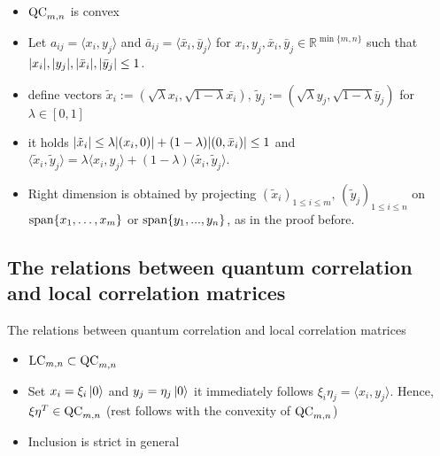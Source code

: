 \begin{frame}
	\begin{itemize}
		\item<1-> $ \textup{QC}_{m,n} $ is convex
		\item<2->Let $a_{ij} = \langle x_i, y_j \rangle $ and $ \bar{a}_{ij} = \langle \bar{x}_i, \bar{y}_j \rangle $ for $ x_{i},y_j, \bar{x}_i,\bar{y}_j \in \mathbb{R}^{\min \{m,n\}} $ such that $ {\left|{x_i}\right|},{\left|{y_j}\right|}, {\left|{\bar{x}_i}\right|}, {\left|{\bar{y}_j}\right|} \le 1 $.
		\item<3-> define vectors $\tilde{x}_i:= (\sqrt{\lambda}x_i,\sqrt{1-\lambda}\bar{x_i}), \, \tilde{y}_j:= (\sqrt{\lambda}y_j, \sqrt{1-\lambda}\bar{y}_j) $ for $ \lambda \in [0,1] $
		\item<4-> it holds $ {\left|{\tilde{x}_i}\right|} \le \lambda {\left|{(x_i,0)}\right|} + (1-\lambda){\left|{(0,\bar{x}_i)}\right|} \le 1 $ and $ \langle \tilde{x}_i, \tilde{y}_j \rangle = \lambda \langle x_i,y_j \rangle + (1-\lambda) \langle \tilde{x_i},\tilde{y}_j \rangle$.
		\item<5-> Right dimension is obtained by projecting $ (\tilde{x}_i)_{1 \le i \le m}, \, (\tilde{y}_j)_{1 \le i \le n} $ on $\textup{span}\{x_1,\hdots,x_m\} $ or $\textup{span}\{y_1,...,y_n\} $, as in the proof before.
	\end{itemize}
\end{frame}
\subsection{The relations between quantum correlation and local correlation matrices}

\begin{frame}{The relations between quantum correlation and local correlation matrices}
	\begin{itemize}
		\item<1-> $ \textup{LC}_{m,n} \subset \textup{QC}_{m,n} $
		\item<2-> Set $ x_i = \xi_i \ket{0}$ and $ y_j = \eta_j\ket{0} $ it immediately follows  $ \xi_i\eta_j = \langle x_i, y_j \rangle $. Hence, $ \xi\eta^T \in \textup{QC}_{m,n} $ (rest follows with the convexity of $ \textup{QC}_{m,n} $)
		\item<3-> Inclusion is strict in general 
	\end{itemize}
\end{frame}

